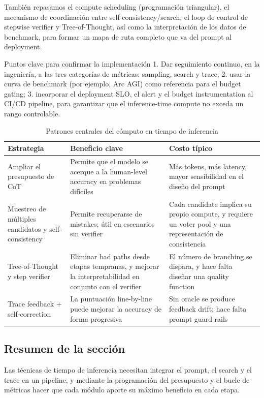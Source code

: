 \documentclass[a4paper]{article}
\begin{document}
También repasamos el compute scheduling (programación triangular), el mecanismo de coordinación entre self-consistency/search, el loop de control de stepwise verifier y Tree-of-Thought, así como la interpretación de los datos de benchmark, para formar un mapa de ruta completo que va del prompt al deployment.

\begin{importantbox}{Puntos clave para confirmar la implementación}
1. Dar seguimiento continuo, en la ingeniería, a las tres categorías de métricas: sampling, search y trace; 2. usar la curva de benchmark (por ejemplo, Arc AGI) como referencia para el budget gating; 3. incorporar el deployment SLO, el alert y el budget instrumentation al CI/CD pipeline, para garantizar que el inference-time compute no exceda un rango controlable.
\end{importantbox}

\begin{table}[H]
\centering
\caption{Patrones centrales del cómputo en tiempo de inferencia}
\begin{tabular}{p{}p{}p{}}
\toprule
Estrategia & Beneficio clave & Costo típico \\
\midrule
Ampliar el presupuesto de CoT & Permite que el modelo se acerque a la human-level accuracy en problemas difíciles & Más tokens, más latency, mayor sensibilidad en el diseño del prompt \\
Muestreo de múltiples candidatos y self-consistency & Permite recuperarse de mistakes; útil en escenarios sin verifier & Cada candidate implica su propio compute, y requiere un voter pool y una representación de consistencia \\
Tree-of-Thought y step verifier & Eliminar bad paths desde etapas tempranas, y mejorar la interpretabilidad en conjunto con el verifier & El número de branching se dispara, y hace falta diseñar una quality function \\
Trace feedback + self-correction & La puntuación line-by-line puede mejorar la accuracy de forma progresiva & Sin oracle se produce feedback drift; hace falta prompt guard rails \\
\bottomrule
\end{tabular}
\end{table}

\subsection{Resumen de la sección}
Las técnicas de tiempo de inferencia necesitan integrar el prompt, el search y el trace en un pipeline, y mediante la programación del presupuesto y el bucle de métricas hacer que cada módulo aporte su máximo beneficio en cada etapa.
\end{document}
